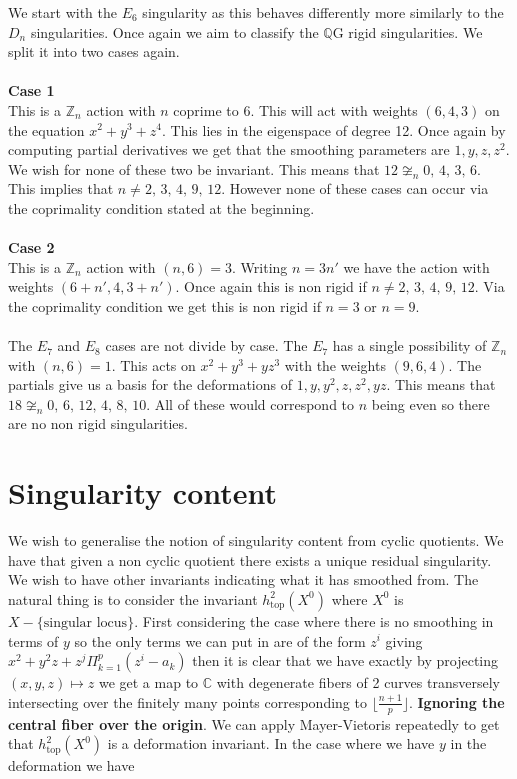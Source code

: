 \documentclass[11pt]{amsart}
\theoremstyle{definition}
\theoremstyle{definition}
\theoremstyle{definition}
\theoremstyle{definition}
\theoremstyle{definition}
\theoremstyle{definition}
\theoremstyle{definition}
\theoremstyle{definition}
\begin{document}
 We start with the $E_6$ singularity as this behaves differently more similarly to the $D_n$ singularities. Once again we aim to classify the $\mathbb{Q}$G rigid singularities. We split it into two cases again. 
 \\
 \\
 \textbf{Case 1}
 \\
 This is a $\mathbb{Z}_n$ action with $n$ coprime to 6. This will act with weights $(6,4,3)$ on the equation $x^2 + y^3 + z^4$. This lies in the eigenspace of degree 12. Once again by computing partial derivatives we get that the smoothing parameters are $1, y, z, z^2$. We wish for none of these two be invariant. This means that $12 \not\cong_n 0, \, 4, \, 3, \, 6$. This implies that $n \neq  2, \, 3, \, 4, \, 9, \, 12$. However none of these cases can occur via the coprimality condition stated at the beginning.
 \\
 \\
 \textbf{Case 2}
 \\
 This is a $\mathbb{Z}_n$ action with $(n, 6) = 3$. Writing $n = 3n'$ we have the action with weights $(6 + n', 4, 3 + n')$. Once again this is non rigid if $n \neq  2, \, 3, \, 4, \, 9, \, 12$. Via the coprimality condition we get this is non rigid if $n=3$ or $n=9$.
 \\
 \\
 The $E_7$ and $E_8$ cases are not divide by case. The $E_7$ has a single possibility of $\mathbb{Z}_n$ with $(n,6) = 1$. This acts on $x^2 + y^3 + yz^3$ with the weights $(9,6,4)$. The partials give us a basis for the deformations of $1, y, y^2, z, z^2, yz$. This means that $18 \not\cong_n 0, \, 6, \, 12, \, 4, \, 8, \, 10$. All of these would correspond to $n$ being even so there are no non rigid singularities. 
 
 
 \section{Singularity content}
 
 We wish to generalise the notion of singularity content from cyclic quotients. We have that given a non cyclic quotient there exists a unique residual singularity. We wish to have other invariants indicating what it has smoothed from. The natural thing is to consider the invariant $h^2_{\text{top}}(X^0)$ where $X^0$ is $X-\{\text{singular locus}\}$. First considering the case where there is no smoothing in terms of $y$ so the only terms we can put in are of the form $z^i$ giving $x^2 + y^2z +z^j \Pi_{k=1}^{p} (z^i - a_k)$ then it is clear that we have exactly by projecting $(x,y,z) \mapsto z$ we get a map to $\mathbb{C}$ with degenerate fibers of 2 curves transversely intersecting over the finitely many points corresponding to $\lfloor \frac{n+1}{p} \rfloor$. 
 \textbf{Ignoring the central fiber over the origin}. We can apply Mayer-Vietoris repeatedly to get that $h^2_{\text{top}}(X^0)$ is a deformation invariant. In the case where we have $y$ in the deformation we have 
 
\end{document}
